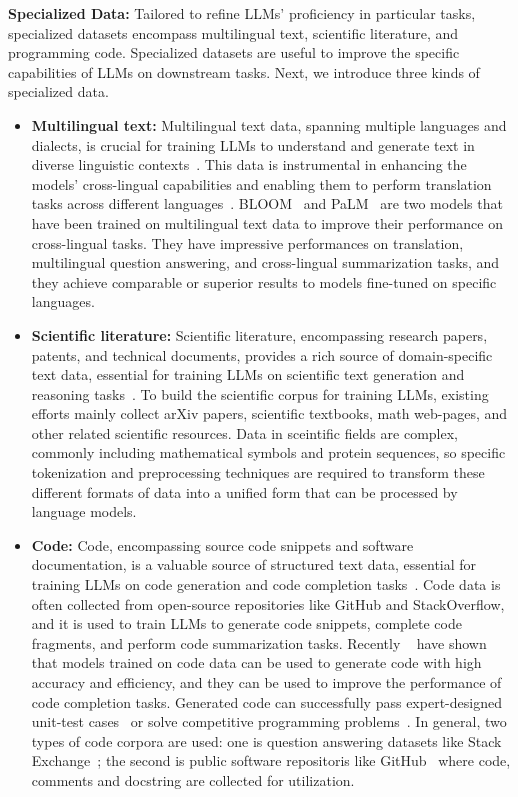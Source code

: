\textbf{Specialized Data:} Tailored to refine LLMs' proficiency in particular tasks, specialized datasets encompass multilingual text, scientific literature, and programming code.
Specialized datasets are useful to improve the specific capabilities of LLMs on downstream tasks.
Next, we introduce three kinds of specialized data.
\begin{itemize}
	\item \textbf{Multilingual text:} {
		      Multilingual text data, spanning multiple languages and dialects, is crucial for training LLMs to understand and generate text in diverse linguistic contexts~\cite{survey}. This data is instrumental in enhancing the models' cross-lingual capabilities and enabling them to perform translation tasks across different languages~\cite{survey}.
		      BLOOM~\cite{workshop2023bloom} and PaLM~\cite{chowdhery2022palm} are two models that have been trained on multilingual text data to improve their performance on cross-lingual tasks. They have impressive performances on translation, multilingual question answering, and cross-lingual summarization tasks, and they achieve comparable or superior results to models fine-tuned on specific languages.
	      }
	\item \textbf{Scientific literature:} {
		      Scientific literature, encompassing research papers, patents, and technical documents, provides a rich source of domain-specific text data, essential for training LLMs on scientific text generation and reasoning tasks~\cite{survey, taylor2022galactica, lewkowycz2022minerva}.
		      To build the scientific corpus for training LLMs, existing efforts mainly collect arXiv papers, scientific textbooks, math web-pages, and other related scientific resources.
		      Data in sceintific fields are complex, commonly including mathematical symbols and protein sequences, so specific tokenization and preprocessing techniques are required to transform these different formats of data into a unified form that can be processed by language models.
	      }
	\item \textbf{Code:} {
		      Code, encompassing source code snippets and software documentation, is a valuable source of structured text data, essential for training LLMs on code generation and code completion tasks~\cite{survey, nijkamp2022codegen}.
		      Code data is often collected from open-source repositories like GitHub and StackOverflow, and it is used to train LLMs to generate code snippets, complete code fragments, and perform code summarization tasks.
		      Recently ~\textcite{chen2021evaluating, austin2021program} have shown that models trained on code data can be used to generate code with high accuracy and efficiency, and they can be used to improve the performance of code completion tasks. Generated code can successfully pass expert-designed unit-test cases~\cite{chen2021evaluating} or solve competitive programming problems~\cite{li2022competition}.
		      In general, two types of code corpora are used: one is question answering datasets like Stack Exchange~\cite{xu2022systematic}; the second is public software repositoris like GitHub~\cite{chen2021evaluating} where code, comments and docstring are collected for utilization.
	      }
\end{itemize}

